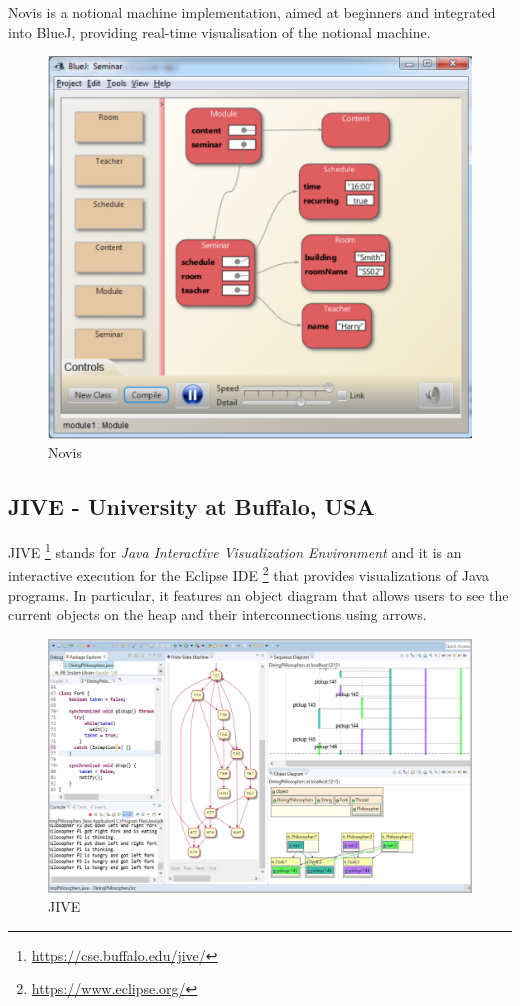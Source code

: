 \documentclass[]{usiinfbachelorproject}
\begin{document}
Novis \cite{7743153} is a notional machine implementation, aimed at beginners and integrated into BlueJ, providing real-time visualisation of the notional machine.

\begin{figure}[h!]
\centering
\includegraphics[scale=0.4]{figures/Novis.png}
\caption {Novis}
\end{figure}

\vspace{\fill}
\pagebreak

\subsection{JIVE - University at Buffalo, USA}

JIVE \footnote{\url{https://cse.buffalo.edu/jive/}} stands for \emph{Java Interactive Visualization Environment} and it is an interactive execution for the Eclipse IDE \footnote{\url{https://www.eclipse.org/}} that provides visualizations of Java programs. In particular, it features an object diagram that allows users to see the current objects on the heap and their interconnections using arrows.

\begin{figure}[h!]
\centering
\includegraphics[width=\textwidth]{figures/jive.png}
\caption {JIVE}
\end{figure}
\end{document}
